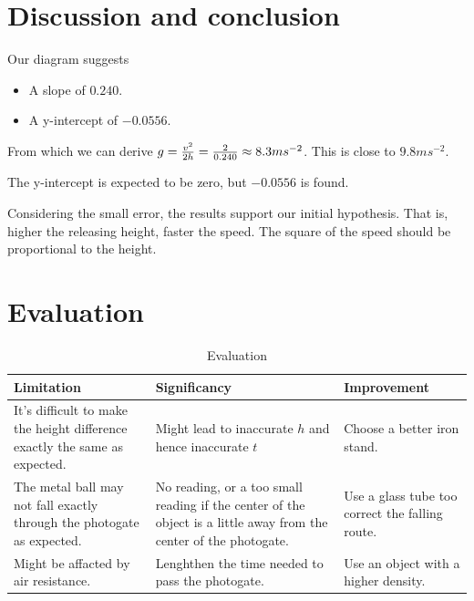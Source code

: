 \documentclass[a4paper]{article}
\begin{document}
\section{Discussion and conclusion}

Our diagram suggests

\begin{itemize}
    \item A slope of $0.240$.
    \item A y-intercept of $-0.0556$.
\end{itemize}

From which we can derive $g = {{v^2}\over{2h}} = {2\over{0.240}}\approx 8.3ms^{-2}$. This is close to $9.8ms^{-2}$.

The y-intercept is expected to be zero, but $-0.0556$ is found.

Considering the small error, the results support our initial hypothesis. That is, higher the releasing height, faster the speed. The square of the speed should be proportional to the height.

\section{Evaluation}

\begin{table}[!ht]
    \centering
    \caption{Evaluation }\label{tab:dummy-1}
    {
      \begin{tabularx}{0.8\textwidth} {|X|X|X|}
        \hline
        Limitation & Significancy & Improvement \\
        \hline
        It's difficult to make the height difference exactly the same as expected. & Might lead to inaccurate $h$ and hence inaccurate $t$  & Choose a better iron stand.\\
        \hline
        The metal ball may not fall exactly through the photogate as expected. & No reading, or a too small reading if the center of the object is a little away from the center of the photogate. & Use a glass tube too correct the falling route. \\
        \hline
        Might be affacted by air resistance. & Lenghthen the time needed to pass the photogate. & Use an object with a higher density.\\
        \hline
      \end{tabularx}
    }
  \end{table}
\end{document}
